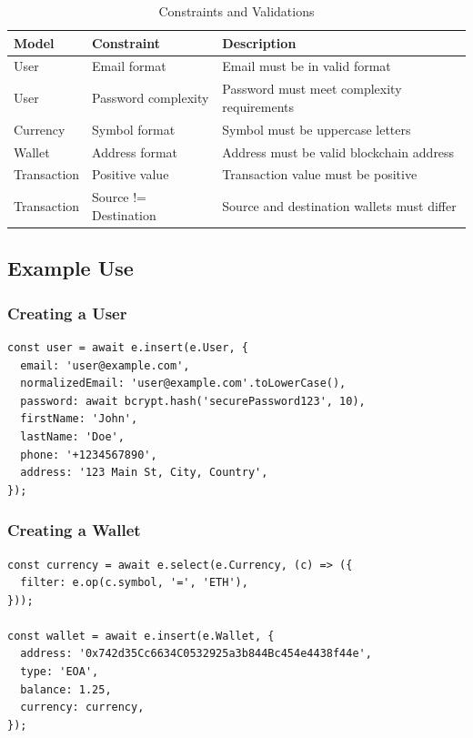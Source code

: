 \begin{table}[htbp]
  \centering
  \caption{Constraints and Validations}
  \renewcommand{\arraystretch}{1.5}
  \begin{tabular}{|p{3cm}|p{4.5cm}|p{7cm}|}
    \hline
    \textbf{Model} & \textbf{Constraint} & \textbf{Description} \\
    \hline
    User & Email format & Email must be in valid format \\
    \hline
    User & Password complexity & Password must meet complexity requirements \\
    \hline
    Currency & Symbol format & Symbol must be uppercase letters \\
    \hline
    Wallet & Address format & Address must be valid blockchain address \\
    \hline
    Transaction & Positive value & Transaction value must be positive \\
    \hline
    Transaction & Source != Destination & Source and destination wallets must differ \\
    \hline
  \end{tabular}
\end{table}
\subsection{Example Use}
\subsubsection*{Creating a User}
\begin{tcolorbox}[width=\textwidth, boxrule=0.5pt, colback=gray!5, colframe=gray!50]
\begin{verbatim}
const user = await e.insert(e.User, {
  email: 'user@example.com',
  normalizedEmail: 'user@example.com'.toLowerCase(),
  password: await bcrypt.hash('securePassword123', 10),
  firstName: 'John',
  lastName: 'Doe',
  phone: '+1234567890',
  address: '123 Main St, City, Country',
});
\end{verbatim}
\end{tcolorbox}
\subsubsection*{Creating a Wallet}
\begin{tcolorbox}[width=\textwidth, boxrule=0.5pt, colback=gray!5, colframe=gray!50]
\begin{verbatim}
const currency = await e.select(e.Currency, (c) => ({
  filter: e.op(c.symbol, '=', 'ETH'),
}));

const wallet = await e.insert(e.Wallet, {
  address: '0x742d35Cc6634C0532925a3b844Bc454e4438f44e',
  type: 'EOA',
  balance: 1.25,
  currency: currency,
});
\end{verbatim}
\end{tcolorbox}
